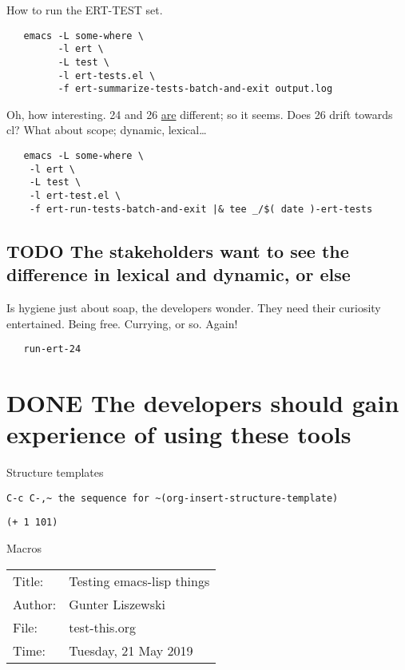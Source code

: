 \documentclass[11pt]{article}
\begin{document}
  How to run the ERT-TEST set.

\begin{verbatim}
   emacs -L some-where \
         -l ert \
         -L test \
         -l ert-tests.el \
         -f ert-summarize-tests-batch-and-exit output.log
\end{verbatim}

  Oh, how interesting. 24 and 26 \underline{are} different; so it seems.
  Does 26 drift towards cl? What about scope; dynamic, lexical\ldots{}
\begin{verbatim}
   emacs -L some-where \
    -l ert \
    -L test \
    -l ert-test.el \
    -f ert-run-tests-batch-and-exit |& tee _/$( date )-ert-tests
\end{verbatim}
\subsection*{\textbf{TODO} The stakeholders want to see the difference in lexical and dynamic, or else}
\label{sec-3-1}

   Is hygiene just about soap, the developers wonder.
   They need their curiosity entertained.
   Being free. Currying, or so. Again!

\begin{verbatim}
   run-ert-24
\end{verbatim}
\section*{\textbf{DONE} The developers should gain experience of using these tools}
\label{sec-4}


  Structure templates

  \verb.C-c C-,~ the sequence for ~(org-insert-structure-template).

\begin{verbatim}
(+ 1 101)
\end{verbatim}

  Macros


\begin{center}
\begin{tabular}{ll}
\hline
 Title:   &  Testing emacs-lisp things  \\
 Author:  &  Gunter Liszewski           \\
\hline
 File:    &  test-this.org              \\
 Time:    &  Tuesday, 21 May 2019       \\
\hline
\end{tabular}
\end{center}
\end{document}
